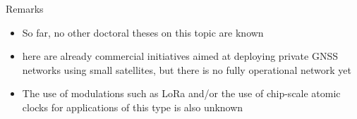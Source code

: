 \begin{frame}{Remarks}

    \begin{itemize}
        \item So far, no other doctoral theses on this topic are known
        \vspace{0.3cm}
        \item here are already commercial initiatives aimed at deploying private GNSS networks using small satellites, but there is no fully operational network yet
        \vspace{0.3cm}
        \item The use of modulations such as LoRa and/or the use of chip-scale atomic clocks for applications of this type is also unknown
    \end{itemize}

\end{frame}
